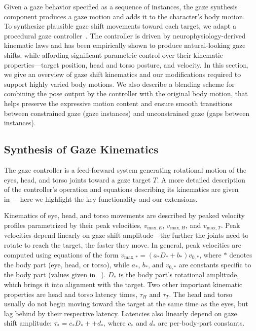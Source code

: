 Given a gaze behavior specified as a sequence of instances, the gaze synthesis component produces a gaze motion and adds it to the character's body motion. To synthesize plausible gaze shift movements toward each target, we adapt a procedural gaze controller~\cite{pejsa2015gaze}. The controller is driven by neurophysiology-derived kinematic laws and has been empirically shown to produce natural-looking gaze shifts, while affording significant parametric control over their kinematic properties---target position, head and torso posture, and velocity. In this section, we give an overview of gaze shift kinematics and our modifications required to support highly varied body motions. We also describe a blending scheme for combining the pose output by the controller with the original body motion, that helps preserve the expressive motion content and ensure smooth transitions between constrained gaze (gaze instances) and unconstrained gaze (gaps between instances).

\subsection{Synthesis of Gaze Kinematics}

The gaze controller is a feed-forward system generating rotational motion of the eyes, head, and torso joints toward a gaze target $T$. A more detailed description of the controller's operation and equations describing its kinematics are given in~\cite{pejsa2015gaze}---here we highlight the key functionality and our extensions.

Kinematics of eye, head, and torso movements are described by peaked velocity profiles parametrized by their peak velocities, $v_{\mathrm{max},E}$, $v_{\mathrm{max},H}$, and $v_{\mathrm{max},T}$. Peak velocities depend linearly on gaze shift amplitude---the further the joints need to rotate to reach the target, the faster they move. In general, peak velocities are computed using equations of the form $v_{\mathrm{max},*} = (a_* D_* + b_*) v_{0,*}$, where $*$ denotes the body part (eye, head, or torso), while $a_*$, $b_*$, and $v_{0,*}$ are constants specific to the body part (values given in ~\cite{pejsa2015gaze}). $D_*$ is the body part's rotational amplitude, which brings it into alignment with the target. Two other important kinematic properties are head and torso latency times, $\tau_H$ and $\tau_T$. The head and torso usually do not begin moving toward the target at the same time as the eyes, but lag behind by their respective latency. Latencies also linearly depend on gaze shift amplitude: $\tau_* = c_* D_* +  + d_*$, where $c_*$ and $d_*$ are per-body-part constants.

